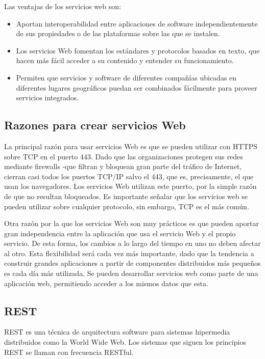 Las ventajas de los servicios web son:

\begin{itemize}
    \item Aportan interoperabilidad entre aplicaciones de software independientemente de sus propiedades o de las plataformas sobre las que se instalen.
    \item Los servicios Web fomentan los estándares y protocolos basados en texto, que hacen más fácil acceder a su contenido y entender su funcionamiento.
    \item Permiten que servicios y software de diferentes compañías ubicadas en diferentes lugares geográficos puedan ser combinados fácilmente para proveer servicios integrados.
   
 \end{itemize}
 
\subsection{Razones para crear servicios Web}

La principal razón para usar servicios Web es que se pueden utilizar con HTTPS sobre \gls{TCP} en el puerto 443. Dado que las organizaciones protegen sus redes mediante firewalls -que filtran y bloquean gran parte del tráfico de Internet, cierran casi todos los puertos TCP/IP salvo el 443, que es, precisamente, el que usan los navegadores. Los servicios Web utilizan este puerto, por la simple razón de que no resultan bloqueados. Es importante señalar que los servicios web se pueden utilizar sobre cualquier protocolo, sin embargo, TCP es el más común.

Otra razón por la que los servicios Web son muy prácticos es que pueden aportar gran independencia entre la aplicación que usa el servicio Web y el propio servicio. De esta forma, los cambios a lo largo del tiempo en uno no deben afectar al otro. Esta flexibilidad será cada vez más importante, dado que la tendencia a construir grandes aplicaciones a partir de componentes distribuidos más pequeños es cada día más utilizada.
Se pueden desarrollar servicios web como parte de una aplicación web, permitiendo acceder a los mismos datos que esta.


\subsection{REST}

REST es una técnica de arquitectura software para sistemas hipermedia distribuidos como la World Wide Web.
Los sistemas que siguen los principios REST se llaman con frecuencia RESTful.

